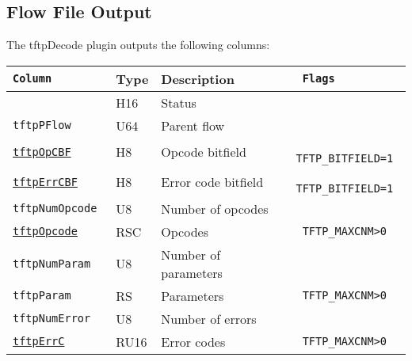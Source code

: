 \documentclass[documentation]{subfiles}
\begin{document}
\subsection{Flow File Output}
The tftpDecode plugin outputs the following columns:
\begin{longtable}{>{\tt}lll>{\tt\small}l}
    \toprule
    {\bf Column} & {\bf Type} & {\bf Description} & {\bf Flags}\\
    \midrule\endhead%
    \nameref{tftpStat}                & H16  & Status               & \\
    tftpPFlow                         & U64  & Parent flow          & \\
    \hyperref[tftpOpCBF]{tftpOpCBF}   & H8   & Opcode bitfield      & TFTP\_BITFIELD=1\\
    \hyperref[tftpErrCBF]{tftpErrCBF} & H8   & Error code bitfield  & TFTP\_BITFIELD=1\\
    tftpNumOpcode                     & U8   & Number of opcodes    & \\
    \hyperref[tftpOpCBF]{tftpOpcode}  & RSC  & Opcodes              & TFTP\_MAXCNM>0\\
    tftpNumParam                      & U8   & Number of parameters & \\
    tftpParam                         & RS   & Parameters           & TFTP\_MAXCNM>0\\
    tftpNumError                      & U8   & Number of errors     & \\
    \hyperref[tftpErrCBF]{tftpErrC}   & RU16 & Error codes          & TFTP\_MAXCNM>0\\
    \bottomrule
\end{longtable}
\end{document}
